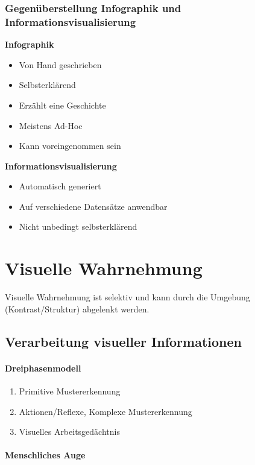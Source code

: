 \documentclass[ngerman]{scrartcl}
\begin{document}
\subsubsection{Gegenüberstellung Infographik und Informationsvisualisierung}

\begin{multicols}{2}%
  \begin{minipage}{0.45\textwidth}
  \textbf{Infographik}
    \begin{itemize}
      \item Von Hand geschrieben
      \item Selbsterklärend
      \item Erzählt eine Geschichte
      \item Meistens Ad-Hoc
      \item Kann voreingenommen sein
    \end{itemize}
  \end{minipage}
  \textbf{Informationsvisualisierung}
    \begin{itemize}
      \item Automatisch generiert
      \item Auf verschiedene Datensätze anwendbar
      \item Nicht unbedingt selbsterklärend
    \end{itemize}
\end{multicols}

\section{Visuelle Wahrnehmung}
Visuelle Wahrnehmung ist selektiv und kann durch die Umgebung (Kontrast/Struktur) abgelenkt werden. 

\subsection{Verarbeitung visueller Informationen}
\paragraph{Dreiphasenmodell} 
\begin{enumerate}
  \item Primitive Mustererkennung
  \item Aktionen/Reflexe, Komplexe Mustererkennung
  \item Visuelles Arbeitsgedächtnis
\end{enumerate}

\paragraph{Menschliches Auge}
\end{document}
